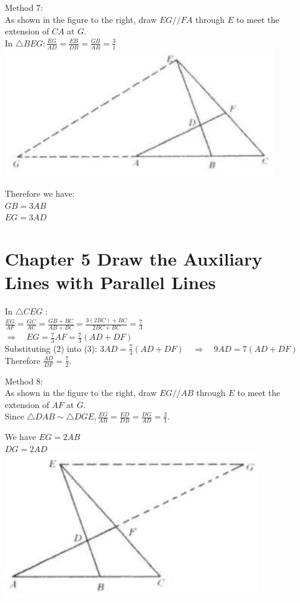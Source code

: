\documentclass[10pt]{article}
\begin{document}
Method 7:\\
As shown in the figure to the right, draw \(E G / / F A\) through \(E\) to meet the extension of \(C A\) at \(G\).\\
In \(\triangle B E G: \frac{E G}{A D}=\frac{E B}{D B}=\frac{G B}{A B}=\frac{3}{1}\)\\
\includegraphics[max width=\textwidth, center]{2025_04_17_97bc1f7e44d93c271a88g-113(1)}

Therefore we have:\\
\(G B=3 A B\)\\
\(E G=3 A D\)

\section*{Chapter 5 Draw the Auxiliary Lines with Parallel Lines}
In \(\triangle C E G\) :\\
\(\frac{E G}{A F}=\frac{G C}{A C}=\frac{G B+B C}{A B+B C}=\frac{3(2 B C)+B C}{2 B C+B C}=\frac{7}{3}\)\\
\(\Rightarrow \quad E G=\frac{7}{3} A F=\frac{7}{3}(A D+D F)\)\\
Substituting (2) into (3): \(3 A D=\frac{7}{3}(A D+D F) \quad \Rightarrow \quad 9 A D=7(A D+D F)\)\\
Therefore \(\frac{A D}{D F}=\frac{7}{2}\).

Method 8:\\
As shown in the figure to the right, draw \(E G / / A B\) through \(E\) to meet the extension of \(A F\) at \(G\).\\
Since \(\triangle D A B \sim \triangle D G E, \frac{E G}{A B}=\frac{E D}{D B}=\frac{D G}{A D}=\frac{2}{1}\).

We have \(E G=2 A B\)\\
\(D G=2 A D\)\\
\includegraphics[max width=\textwidth, center]{2025_04_17_97bc1f7e44d93c271a88g-114}
\end{document}
